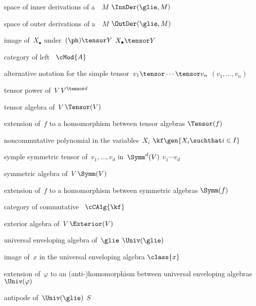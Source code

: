 {space of inner derivations of a~\representation{$\glie$}~$M$}
{$\InnDer(\glie, M)$}

{space of outer derivations of a~\representation{$\glie$}~$M$}
{$\OutDer(\glie, M)$}

{image of~$X_\bullet$ under~$(\ph) \tensor Y$}
{$X_\bullet \tensor Y$}

{category of left~}
{$\cMod{A}$}

{alternative notation for the simple tensor~$v_1 \tensor \dotsb \tensor v_n$}
{$(v_1, \dotsc, v_n)$}

{ tensor power of~$V$}
{$V^{\tensor d}$}

{tensor algebra of~$V$}
{$\Tensor(V)$}

{extension of~$f$ to a homomorphism between tensor algebras}
{$\Tensor(f)$}

{noncommutative polynomial in the variables~$X_i$}
{$\kf\gen{ X_i \suchthat i \in I}$}

{symple symmetric tensor of~$v_1, \dotsc, v_d$ in~$\Symm^d(V)$}
{$v_1 \dotsm v_d$}

{symmetric algebra of~$V$}
{$\Symm(V)$}

{extension of~$f$ to a homomorphism between symmetric algebras}
{$\Symm(f)$}

{category of commutative~\algebras{$\kf$}}
{$\cCAlg{\kf}$}

{exterior algebra of~$V$}
{$\Exterior(V)$}

{universal enveloping algebra of~$\glie$}
{$\Univ(\glie)$}

{image of~$x$ in the universal enveloping algebra}
{$\class{x}$}

{extension of~$\varphi$ to an (anti-)homomorphism between universal enveloping algebras}
{$\Univ(\varphi)$}

{antipode of~$\Univ(\glie)$}
{$S$}

